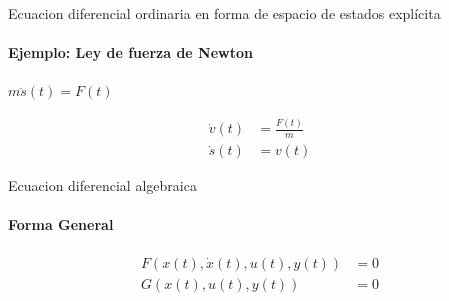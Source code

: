 \begin{frame}{Ecuacion diferencial ordinaria en forma de espacio de estados explícita}
    \framesubtitle{Ejemplo: Ley de fuerza de Newton}   
    \begin{center}
        $m\ddot{s}(t)=F(t)$
    \end{center}
    \pause 
    \begin{align*}
        \dot{v}(t) & =\frac{F(t)}{m}\\
        \dot{s}(t) & =v(t)
    \end{align*}
\end{frame} 

\begin{frame}[fragile]{Ecuacion diferencial algebraica}
   \framesubtitle{Forma General}
   \begin{align*}
        F(x(t),\dot{x}(t),u(t),y(t)) & =0 \\
        G(x(t),u(t),y(t))            & =0
   \end{align*}
\end{frame}

